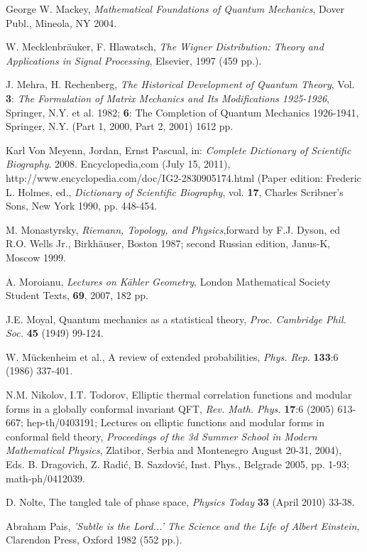 \documentclass[12pt]{article}
\begin{document}
\begin{thebibliography}{000}
 George W. Mackey, {\it Mathematical Foundations of Quantum Mechanics},
Dover Publ., Mineola, NY 2004.

 W. Mecklenbr\"auker, F. Hlawatsch, {\it The Wigner Distribution: Theory 
 and Applications in Signal Processing}, Elsevier, 1997 (459 pp.).	

 J. Mehra, H. Rechenberg, {\it The Historical Development of
Quantum Theory}, Vol. {\bf 3}: {\it The Formulation of Matrix Mechanics and Its
Modifications 1925-1926}, Springer, N.Y. et al. 1982; {\bf 6}: The Completion of
Quantum Mechanics 1926-1941, Springer, N.Y. (Part 1, 2000, Part 2, 2001) 
1612 pp.

 Karl Von Meyenn, Jordan, Ernst Pascual, in: {\it Complete
Dictionary of Scientific Biography}. 2008. Encyclopedia,com (July 15, 2011),
http://www.encyclopedia.com/doc/IG2-2830905174.html (Paper edition: Frederic L.
 Holmes, ed., {\it Dictionary of Scientific Biography}, vol. {\bf 17}, Charles
Scribner's Sons, New York 1990, pp. 448-454.

 M. Monastyrsky, {\it Riemann, Topology, and Physics},forward 
by F.J. Dyson, ed R.O. Wells Jr., Birkh\"auser, Boston 1987; second Russian 
edition, Janus-K, Moscow 1999.

 A. Moroianu, {\it Lectures on K\"ahler Geometry}, London
Mathematical Society Student Texts, {\bf 69}, 2007, 182 pp.

 J.E. Moyal, Quantum mechanics as a statistical theory,
{\it Proc. Cambridge Phil. Soc.} {\bf 45} (1949) 99-124.

 W. M\"uckenheim et al., A review of extended probabilities, 
{\it Phys. Rep.} {\bf 133}:6 (1986) 337-401.

 N.M. Nikolov, I.T. Todorov, Elliptic thermal correlation 
functions and modular forms in a globally conformal invariant QFT, {\it Rev. 
Math. Phys.} {\bf 17}:6 (2005) 613-667; hep-th/0403191; Lectures on elliptic 
functions and modular forms in conformal field theory, {\it Proceedings of the 
3d Summer  School in Modern Mathematical Physics}, Zlatibor, Serbia and 
Montenegro August 20-31, 2004), Eds. B. Dragovich, Z. Radi\'c, B. Sazdovi\'c, 
Inst. Phys., Belgrade 2005, pp. 1-93; math-ph/0412039.

 D. Nolte, The tangled tale of phase space, {\it Physics Today} 
{\bf 33} (April 2010) 33-38.

Abraham Pais, {\it 'Subtle is the Lord...' The Science and the
Life of Albert Einstein}, Clarendon Press, Oxford 1982 (552 pp.).


\end{thebibliography}
\end{document}
